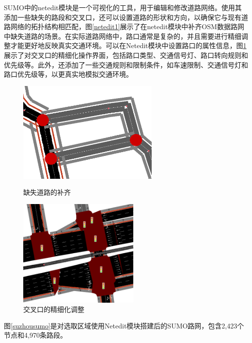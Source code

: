 SUMO中的netedit模块是一个可视化的工具，用于编辑和修改道路网络。使用其添加一些缺失的路段和交叉口，还可以设置道路的形状和方向，以确保它与现有道路网络的拓扑结构相匹配，图\ref{netedit1}展示了在netedit模块中补齐OSM数据路网中缺失道路的场景。在实际道路网络中，路口通常是复杂的，并且需要进行精细调整才能更好地反映真实交通环境。可以在Netedit模块中设置路口的属性信息，图\ref{netedit2}展示了对交叉口的精细化操作界面，包括路口类型、交通信号灯、路口转向规则和优先级等。此外，还添加了一些交通规则和限制条件，如车速限制、交通信号灯和路口优先级等，以更真实地模拟交通环境。

\begin{figure}
  \centering
    \begin{minipage}[t]{0.48\textwidth}
      \centering
      \includegraphics[width=7cm]{figures/content/netedit1.png}
      \caption{缺失道路的补齐}
      \label{netedit1}
    \end{minipage}
    \begin{minipage}[t]{0.48\textwidth}
      \centering
      \includegraphics[width=6cm]{figures/content/netedit2.png}
      \caption{交叉口的精细化调整}
      \label{netedit2}
    \end{minipage}
\end{figure}



图\ref{suzhousumo}是对选取区域使用Netedit模块搭建后的SUMO路网，包含2,423个节点和4,970条路段。

